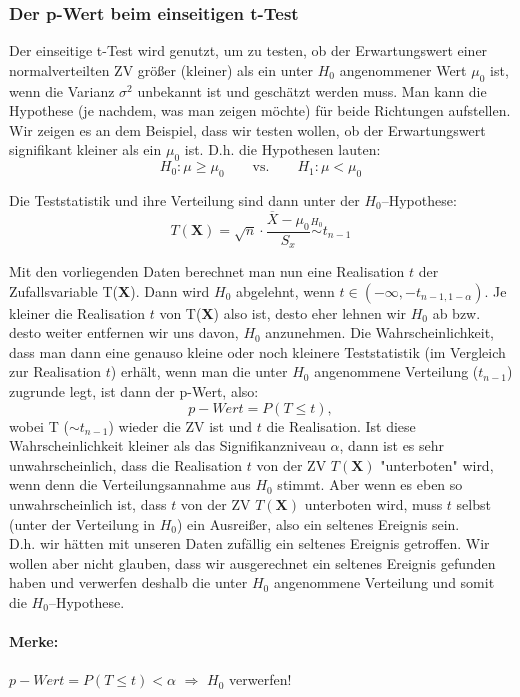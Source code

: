 \documentclass[a4paper]{article}
\newcommand{\simtext}[1]{\ensuremath{\stackrel{\text{#1}}{\sim}}}
\begin{document}
\subsubsection{Der p-Wert beim einseitigen t-Test}\label{sec:pWert1}

Der einseitige t-Test wird genutzt, um zu testen, ob der Erwartungswert einer normalverteilten ZV größer (kleiner) als ein unter $H_0$ angenommener Wert $\mu_0$ ist, wenn die Varianz $\sigma^2$ unbekannt ist und geschätzt werden muss.  Man kann die Hypothese (je nachdem, was man zeigen möchte) für beide Richtungen aufstellen. Wir zeigen es an dem Beispiel, dass wir testen wollen, ob der Erwartungswert signifikant kleiner als ein $\mu_0$ ist. D.h. die Hypothesen lauten:
$$H_0: \mu \geq \mu_0 \qquad \mbox{vs.} \qquad H_1: \mu < \mu_0$$

\noindent Die Teststatistik und ihre Verteilung sind dann unter der $H_0$--Hypothese:
$$T(\textbf{X})=\sqrt{n}\cdot\frac{\overline{X}-\mu_0}{S_x} \simtext{$H_0$} t_{n-1}$$

\noindent Mit den vorliegenden Daten berechnet man nun eine Realisation $t$ der Zufallsvariable T(\textbf{X}). Dann wird $H_0$ abgelehnt, wenn $t \in (-\infty, -t_{n-1,1-\alpha})$. Je kleiner die Realisation $t$ von T(\textbf{X}) also ist, desto eher lehnen wir $H_0$ ab bzw. desto weiter entfernen wir uns davon, $H_0$ anzunehmen. Die Wahrscheinlichkeit, dass man dann eine genauso kleine oder noch kleinere Teststatistik (im Vergleich zur Realisation $t$) erhält, wenn man die unter $H_0$ angenommene Verteilung ($t_{n-1}$) zugrunde legt, ist dann der p-Wert, also:
$$p-Wert=P(T \leq t),$$
wobei T ($\sim t_{n-1}$) wieder die ZV ist und $t$ die Realisation. Ist diese Wahrscheinlichkeit kleiner als das Signifikanzniveau $\alpha$, dann ist es sehr unwahrscheinlich, dass die Realisation $t$ von der ZV $T(\textbf{X})$ "unterboten" wird, wenn denn die Verteilungsannahme aus $H_0$ stimmt. Aber wenn es eben so unwahrscheinlich ist, dass $t$ von der ZV $T(\textbf{X})$ unterboten wird, muss $t$ selbst (unter der Verteilung in $H_0$) ein Ausreißer, also ein seltenes Ereignis sein.\\
D.h. wir hätten mit unseren Daten zufällig ein seltenes Ereignis getroffen. Wir wollen aber nicht glauben, dass wir ausgerechnet ein seltenes Ereignis gefunden haben und verwerfen deshalb die unter $H_0$ angenommene Verteilung und somit die $H_0$--Hypothese.

\paragraph{Merke:} $p-Wert=P(T \leq t) < \alpha$ $\Rightarrow$ $H_0$ verwerfen!\\
\end{document}
